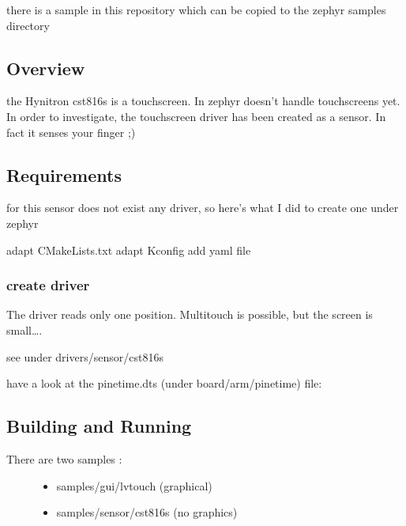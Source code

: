 \documentclass[letterpaper,10pt,english]{sphinxmanual}
\begin{document}
there is a sample in this repository which can be copied to the zephyr samples directory

\begin{sphinxVerbatim}[commandchars=\\\{\}]
\end{sphinxVerbatim}


\subsection{Overview}
\label{\detokenize{drivers/cst816s:overview}}
the Hynitron cst816s is a touchscreen.
In zephyr doesn’t handle touchscreens yet.
In order to investigate, the touchscreen driver has been created as a sensor.
In fact it senses your finger ;)


\subsection{Requirements}
\label{\detokenize{drivers/cst816s:requirements}}
for this sensor does not exist any driver, so here’s what I did to create one under zephyr

adapt CMakeLists.txt
adapt Kconfig
add yaml file


\subsubsection{create driver}
\label{\detokenize{drivers/cst816s:create-driver}}
The driver reads only one position.
Multitouch is possible, but the screen is small….

see under drivers/sensor/cst816s

have a look at the pinetime.dts (under board/arm/pinetime) file:

\begin{sphinxVerbatim}[commandchars=\\\{\}]
\end{sphinxVerbatim}


\subsection{Building and Running}
\label{\detokenize{drivers/cst816s:building-and-running}}\begin{description}
\item[{There are two samples :}] \leavevmode\begin{itemize}
\item {} 
samples/gui/lvtouch (graphical)

\item {} 
samples/sensor/cst816s (no graphics)

\end{itemize}

\end{description}
\end{document}
